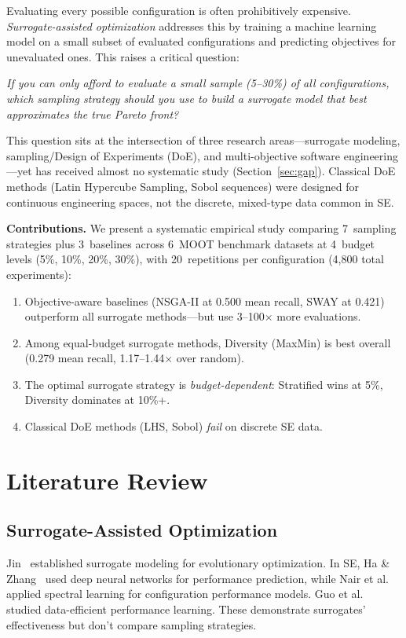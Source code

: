 \documentclass[conference]{IEEEtran}
\begin{document}
Evaluating every possible configuration is often prohibitively expensive. \emph{Surrogate-assisted optimization} addresses this by training a machine learning model on a small subset of evaluated configurations and predicting objectives for unevaluated ones. This raises a critical question:

\emph{If you can only afford to evaluate a small sample (5--30\%) of all configurations, which sampling strategy should you use to build a surrogate model that best approximates the true Pareto front?}

This question sits at the intersection of three research areas---surrogate modeling, sampling/Design of Experiments (DoE), and multi-objective software engineering---yet has received almost no systematic study (Section~\ref{sec:gap}). Classical DoE methods (Latin Hypercube Sampling, Sobol sequences) were designed for continuous engineering spaces, not the discrete, mixed-type data common in SE.

\textbf{Contributions.} We present a systematic empirical study comparing 7~sampling strategies plus 3~baselines across 6~MOOT benchmark datasets at 4~budget levels (5\%, 10\%, 20\%, 30\%), with 20~repetitions per configuration (4,800 total experiments):

\begin{enumerate}
    \item Objective-aware baselines (NSGA-II at 0.500 mean recall, SWAY at 0.421) outperform all surrogate methods---but use 3--100$\times$ more evaluations.
    \item Among equal-budget surrogate methods, Diversity (MaxMin) is best overall (0.279 mean recall, 1.17--1.44$\times$ over random).
    \item The optimal surrogate strategy is \emph{budget-dependent}: Stratified wins at 5\%, Diversity dominates at 10\%+.
    \item Classical DoE methods (LHS, Sobol) \emph{fail} on discrete SE data.
\end{enumerate}

\section{Literature Review}
\label{sec:lit}

\subsection{Surrogate-Assisted Optimization}
Jin~\cite{jin2003} established surrogate modeling for evolutionary optimization. In SE, Ha \& Zhang~\cite{ha2019deepperf} used deep neural networks for performance prediction, while Nair et al.~\cite{nair2018flash} applied spectral learning for configuration performance models. Guo et al.~\cite{guo2018} studied data-efficient performance learning. These demonstrate surrogates' effectiveness but don't compare sampling strategies.
\end{document}
